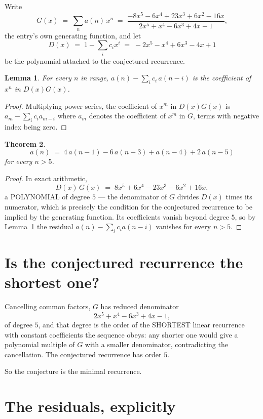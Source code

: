 \documentclass[11pt,a4paper]{article}
\theoremstyle{plain}
\newtheorem{theorem}{Theorem}
\newtheorem{lemma}[theorem]{Lemma}
\theoremstyle{definition}
\begin{document}
Write
\[
G(x)\;=\;\sum_{n}a(n)\,x^{n}\;=\;\frac{- 8 x^{5} - 6 x^{4} + 23 x^{3} + 6 x^{2} - 16 x}{2 x^{5} + x^{4} - 6 x^{3} + 4 x - 1},
\]
the entry's own generating function, and let
\[
D(x)\;=\;1-\sum_i c_i x^{i}\;=\;- 2 x^{5} - x^{4} + 6 x^{3} - 4 x + 1
\]
be the polynomial attached to the conjectured recurrence.

\begin{lemma}\label{lem:key}
For every $n$ in range, $a(n)-\sum_i c_i\,a(n-i)$ is the coefficient of $x^{n}$ in
$D(x)G(x)$.
\end{lemma}

\begin{proof}
Multiplying power series, the coefficient of $x^{m}$ in $D(x)G(x)$ is
$a_m-\sum_i c_i a_{m-i}$ where $a_m$ denotes the coefficient of $x^{m}$ in $G$, terms with
negative index being zero.
\end{proof}

\begin{theorem}
\[
a(n)\;=\;4\,a(n-1) - 6\,a(n-3) + a(n-4) + 2\,a(n-5)
\]
for every $n>5$.
\end{theorem}

\begin{proof}
In exact arithmetic,
\[
D(x)\,G(x)\;=\;8 x^{5} + 6 x^{4} - 23 x^{3} - 6 x^{2} + 16 x,
\]
a POLYNOMIAL of degree $5$ --- the denominator of $G$ divides $D(x)$ times its numerator,
which is precisely the condition for the conjectured recurrence to be implied by the
generating function. Its coefficients vanish beyond degree $5$, so by
Lemma~\ref{lem:key} the residual $a(n)-\sum_ic_ia(n-i)$ vanishes for every
$n>5$.
\end{proof}

\section{Is the conjectured recurrence the shortest one?}

Cancelling common factors, $G$ has reduced denominator
\[
2 x^{5} + x^{4} - 6 x^{3} + 4 x - 1,
\]
of degree $5$, and that degree is the order of the SHORTEST linear recurrence with
constant coefficients the sequence obeys: any shorter one would give a polynomial multiple of
$G$ with a smaller denominator, contradicting the cancellation. The conjectured recurrence has
order $5$.

So the conjecture is the minimal recurrence.

\section{The residuals, explicitly}
\end{document}
